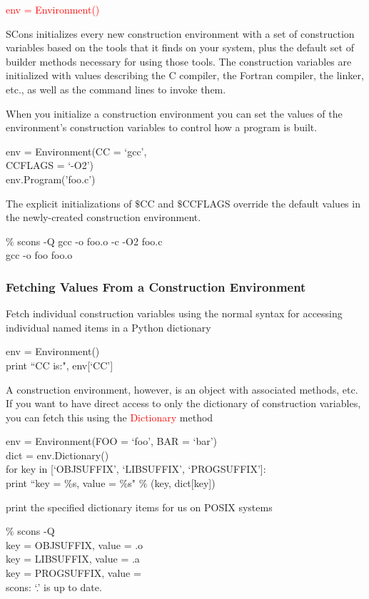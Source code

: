 \documentclass[12pt,a4paper]{article}
\begin{document}
\textcolor{red}{env = Environment()}

SCons initializes every new construction environment with a set of construction variables based on the tools that it finds on your system, plus the default set of builder methods necessary for using those tools. The construction variables are initialized with values describing the C compiler, the Fortran compiler, the linker, etc., as well as the command lines to invoke them.

When you initialize a construction environment you can set the values of the environment's construction variables to control how a program is built. 

env = Environment(CC = `gcc', \\
                  CCFLAGS = `-O2') \\
env.Program('foo.c')

The explicit initializations of $\$$CC and $\$$CCFLAGS override the default values in the newly-created construction environment.

$\%$ scons -Q
gcc -o foo.o -c -O2 foo.c \\
gcc -o foo foo.o

\subsubsection{Fetching Values From a Construction Environment}
Fetch individual construction variables using the normal syntax for accessing individual named items in a Python dictionary

env = Environment() \\
print ``CC is:", env[`CC']

A construction environment, however, is an object with associated methods, etc. If you want to have direct access to only the dictionary of construction variables, you can fetch this using the \textcolor{red}{Dictionary} method

env = Environment(FOO = `foo', BAR = `bar') \\
dict = env.Dictionary() \\
for key in [`OBJSUFFIX', `LIBSUFFIX', `PROGSUFFIX']: \\
    print ``key = $\%$s, value = $\%$s" $\%$ (key, dict[key])

print the specified dictionary items for us on POSIX systems 

$\%$ scons -Q \\
key = OBJSUFFIX, value = .o \\
key = LIBSUFFIX, value = .a \\
key = PROGSUFFIX, value = \\
scons: `.' is up to date.
\end{document}
